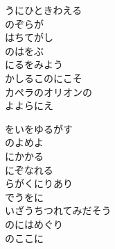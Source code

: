 \documentclass[10pt,b5j]{tarticle} %
\begin{document}
\vspace{1.5em} %
\newcommand{\linespace}{0.5em} %
\newcommand{\blocksize}{0.5\hsize} %
\begin{enumerate} %
    \begin{minipage}[c]{\blocksize}
    
        \vspace{\linespace}
        \item
        うにひときわえる\\
        のぞらが\\
        はちてがし\\
        のはをぶ\\
        にるをみよう\\
        かしるこのにこそ\\
        カペラのオリオンの\\
        よよらにえ
        
        \vspace{\linespace}
        \item
        をいをゆるがす\\
        のよめよ\\
        にかかる\\
        にぞなれる\\
        らがくにりあり\\
        でうをに\\
        いざうちつれてみだそう\\
        のにはめぐり\\
        のここに
    
    \end{minipage}
\end{enumerate} %
\end{document}
